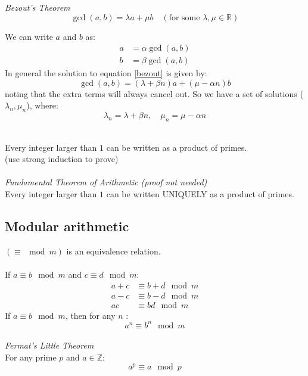 \documentclass{scrartcl}
\newcommand{\R}{\mathbb{R}}
\newcommand{\Z}{\mathbb{Z}}
\begin{document}
\textit{Bezout's Theorem}
\begin{equation} \label{bezout}
\gcd(a, b) = \lambda a + \mu b \quad (\textrm{for some } \lambda, \mu \in \R)
\end{equation}
\begin{tcolorbox}[breakable]
We can write $ a $ and $ b $ as:
\begin{align}
a & = \alpha \gcd(a, b) \\
b & = \beta \gcd(a, b)
\end{align}
In general the solution to equation \ref{bezout} is given by:
\begin{equation}
\gcd(a, b) = (\lambda + \beta n) a + (\mu - \alpha n) b
\end{equation}
noting that the extra terms will always cancel out. So we have a set of solutions ($ \lambda_{n}, \mu_{n} $), where:
\begin{equation}
\lambda_{n} = \lambda + \beta n, \quad \mu_{n} = \mu - \alpha n
\end{equation}
\end{tcolorbox}
\noindent
\\
Every integer larger than $ 1 $ can be written as a product of primes.
\\
(use strong induction to prove)
\\\\
\textit{Fundamental Theorem of Arithmetic (proof not needed)}
\\
Every integer larger than $ 1 $ can be written UNIQUELY as a product of primes.

\subsection{Modular arithmetic}
$ (\equiv \mod m) $ is an equivalence relation.
\\\\
If $ a \equiv b \mod m $ and $ c \equiv d \mod m $:
\begin{align}
a + c & \equiv b + d \mod m \\
a - c & \equiv b - d \mod m \\
ac & \equiv bd \mod m
\end{align}
If $ a \equiv b \mod m $, then for any $ n $ :
\begin{equation}
a^{n} \equiv b^{n} \mod m
\end{equation}
\\
\textit{Fermat's Little Theorem}
\\
For any prime $ p $ and $ a \in \Z $:
\begin{equation}
a^{p} \equiv a \mod p
\end{equation}
\end{document}
